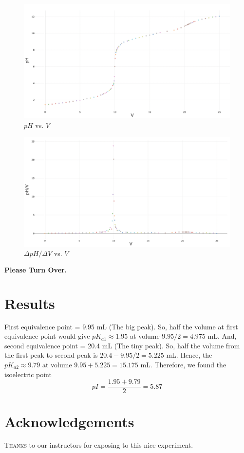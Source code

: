 \documentclass[11pt, a4paper, abstract=true]{scrartcl}
\begin{document}
\begin{figure}[H]
    \centering
    \includegraphics[scale=0.4]{data2.png}
    \caption{\(pH\) vs. \(V\)}
\end{figure}

\begin{figure}[H]
    \centering
    \includegraphics[scale=0.4]{data.png}
    \caption{\(\Delta pH/\Delta V\) vs. \(V\)}
\end{figure}

\textbf{Please Turn Over.}

\section{Results}

First equivalence point = 9.95 mL (The big peak). So, half the volume at first equivalence point would give \(pK_{a1} \approx 1.95\) at volume \(9.95/2 = 4.975\) mL. And, second equivalence point = 20.4 mL (The tiny peak). So, half the volume from the first peak to second peak is \(20.4 - 9.95/2 = 5.225\) mL. Hence, the \(pK_{a2} \approx 9.79\) at volume  \(9.95 + 5.225 = 15.175\) mL. Therefore, we found the isoelectric point \[pI = \frac{1.95 + 9.79}{2} = \boxed{5.87}\]

\section{Acknowledgements}

\textsc{Thanks} to our instructors for exposing to this nice experiment.
\end{document}

